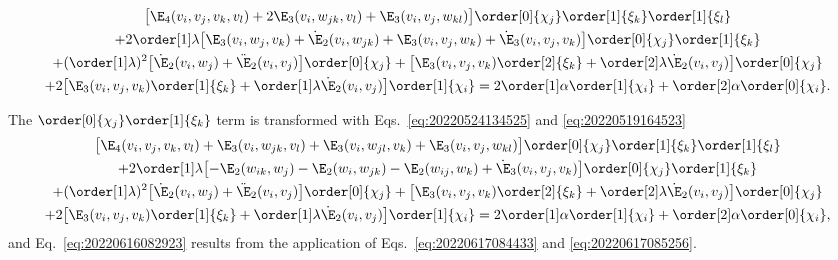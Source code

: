 \begin{multline*}
  \bigl[ \E_4(v_i, v_j,  v_k, v_l) + 2\E_3(v_i, w_{jk}, v_l) + \E_3(v_i, v_j, w_{kl})\bigr] \order[0]{\chi_j} \order[1]{\xi_k} \order[1]{\xi_l}\\
  + 2 \order[1]\lambda \bigl[ \E_3(v_i,  w_j, v_k) + \dot{\E}_2(v_i, w_{jk}) + \E_3(v_i, v_j, w_k) + \dot{\E}_3(v_i, v_j,  v_k) \bigr] \order[0]{\chi_j} \order[1]{\xi_k}\\
  + ( \order[1]\lambda )^2 \bigl[\dot{\E}_2(v_i, w_j) + \ddot{\E}_2(v_i, v_j)\bigr] \order[0]{\chi_j} + \bigl[\E_3(v_i, v_j, v_k) \order[2]{\xi_k} + \order[2]\lambda \dot{\E}_2(v_i, v_j)\bigr] \order[0]{\chi_j} \\
  +2\bigl[\E_3(v_i, v_j,  v_k)  \order[1]{\xi_k} + \order[1]\lambda \dot{\E}_2(v_i, v_j)\bigr] \order[1]{\chi_i} = 2\order[1]\alpha\order[1]{\chi_i} + \order[2]\alpha \order[0]{\chi_i}.
\end{multline*}

The $\order[0]{\chi_j} \order[1]{\xi_k}$ term is transformed with Eqs.~\eqref{eq:20220524134525} and
\eqref{eq:20220519164523}
\begin{multline*}
  \bigl[ \E_4(v_i, v_j,  v_k, v_l)
  + \E_3(v_i, w_{jk}, v_l)
  + \E_3(v_i, w_{jl}, v_k)
  + \E_3(v_i, v_j, w_{kl})\bigr] \order[0]{\chi_j} \order[1]{\xi_k} \order[1]{\xi_l}\\
  + 2\order[1]\lambda \bigl[ -\E_2(w_{ik},  w_j) - \E_2(w_i, w_{jk}) - \E_2(w_{ij}, w_k) + \dot{\E}_3(v_i, v_j,  v_k) \bigr] \order[0]{\chi_j} \order[1]{\xi_k}\\
  + ( \order[1]\lambda )^2 \bigl[\dot{\E}_2(v_i, w_j) + \ddot{\E}_2(v_i, v_j)\bigr] \order[0]{\chi_j}
  + \bigl[\E_3(v_i, v_j, v_k) \order[2]{\xi_k} + \order[2]\lambda \dot{\E}_2(v_i, v_j)\bigr] \order[0]{\chi_j} \\
  +2\bigl[\E_3(v_i, v_j,  v_k)  \order[1]{\xi_k}
  + \order[1]\lambda \dot{\E}_2(v_i, v_j)\bigr] \order[1]{\chi_i}
  = 2\order[1]\alpha\order[1]{\chi_i}
  + \order[2]\alpha \order[0]{\chi_i},
\end{multline*}
and Eq.~\eqref{eq:20220616082923} results from the application of Eqs.~\eqref{eq:20220617084433} and
\eqref{eq:20220617085256}.



